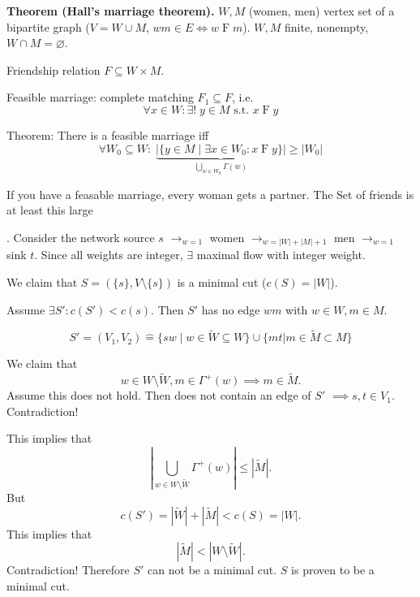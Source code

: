 

\strut{}
\textbf{Theorem (Hall's marriage theorem).}
$W, M$ (women, men) vertex set of a bipartite graph
($V=W\cup M$, $wm \in E \iff w\operatorname{F}m$). $W,M$ finite, nonempty, $W\cap M=\varnothing$.

Friendship relation $F\subseteq W\times M$.

Feasible marriage: complete matching $F_1\subseteq F$, i.e.
\[ \forall x\in W: \exists!\;y\in M\text{ s.t. }x\operatorname{F} y \]

Theorem: There is a feasible marriage iff
\[
    \forall W_0\subseteq W:\;
        \underbrace{
            |\{y\in M\mid \exists x\in W_0: x\operatorname{F} y\}|
        }_{\bigcup\limits_{w\in W_0} \Gamma(w)}
        ≥ |W_0|
\]

If you have a feasable marriage, every woman gets a partner.
The Set of friends is at least this large

\Proof.
Consider the network source $s$ $\rightarrow_{w=1}$ women $\rightarrow_{w=|W|+|M|+1}$ men $\rightarrow_{w=1}$ sink $t$.
Since all weights are integer, $\exists$ maximal flow with integer weight.



We claim that $S=(\{s\}, V \setminus \{s\})$
is a minimal cut ($c(S) = |W|$).

Assume $\exists S': c(S') < c(s)$. Then $S'$ has no edge $wm$ with $w\in W, m\in M$.

\[
S' = (V_1,V_2) \hat{=}
    \{sw\mid w \in \widetilde{W} \subseteq W \} \cup
    \{mt | m \in \widetilde{M} \subset M \}
\]

\def\GammaPlus{\Gamma^{+}}

We claim that
\[
    w\in W\setminus\widetilde{W}, m\in\GammaPlus(w)
    \implies m\in\widetilde{M}.
\]
Assume this does not hold. Then
 does not contain an edge of $S'$ $\implies s, t\in V_1$. Contradiction!

This implies that
\[
    |\bigcup\limits_{w\in W\setminus\widetilde{W}} \GammaPlus(w)|
    ≤ |\widetilde{M}|.
\]
But
\[
    c(S') = |\widetilde{W}| + |\widetilde{M}| < c(S) = |W|.
\]
This implies that
\[
    |\widetilde{M}| < |W\setminus \widetilde{W}|.
\]
Contradiction! Therefore $S'$ can not be a minimal cut. $S$ is proven to be a minimal cut.

